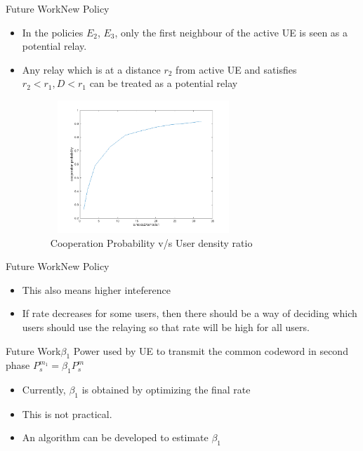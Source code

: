 \documentclass{beamer}
\begin{document}
\begin{frame}{Future Work}{New Policy}
  \begin{itemize}
  \item
     In the policies $E_2$, $E_3$, only the first neighbour of the active UE is seen as a potential relay. 
    
   \item Any relay which is at a distance $r_2$ from active UE and satisfies $r_2<r_1, D < r_1$ can be treated as a potential relay
   \begin{figure}[!h]
        \includegraphics[width=7cm, height= 5cm]{figures/simulCoopE4.png}
        \centering
        \vspace{-2mm}
        \caption{Cooperation Probability v/s User density ratio}
        \label{plot3}
    \end{figure}    
 \end{itemize}   

\end{frame}

\begin{frame}{Future Work}{New Policy}
\vspace{1cm}
\begin{itemize}  
  \item
   This also means higher inteference
   \vspace{1cm}
  \item If rate decreases for some users, then there should be a way of deciding which users should use the relaying so that rate will be high for all users. 
  \end{itemize}
\end{frame}

\begin{frame}{Future Work}{$\beta_1$}
Power used by UE to transmit the common codeword in second phase $P_s^{m_1} = \beta_1 P_s^m$
\begin{itemize}  
  \item
   Currently, $\beta_1$ is obtained by optimizing the final rate
   \vspace{1cm}
   \pause
  \item This is not practical. 
  \pause
  \vspace{1cm}
  \item An algorithm can be developed to estimate $\beta_1$  
  \end{itemize}
\end{frame}
\end{document}
